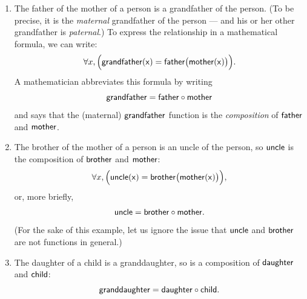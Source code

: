 \begin{example}{} 
\begin{enumerate}
\item The father of the mother of a person is a grandfather of the person.
 (To be precise, it is the \emph{maternal} grandfather of the person --- and his or her other grandfather is \emph{paternal}.) To express the relationship in a mathematical formula, we can write:
 $$ \forall x,  \Bigl( \sf{grandfather}(x) = \sf{father} \bigl( \sf{mother}(x) \bigr) \Bigr) .$$
 A mathematician abbreviates this formula by writing
 $$ \sf{grandfather} = \sf{father} \circ \sf{mother} $$
 and says that the (maternal) $\sf{grandfather}$ function is the \emph{composition} of $\sf{father}$ and $\sf{mother}$.
 \item The brother of the mother of a person is an uncle of the person, so $\sf{uncle}$ is the composition of $\sf{brother}$ and $\sf{mother}$:
  $$ \forall x, \Bigl( \sf{uncle}(x) = \sf{brother} \bigl( \sf{mother}(x) \bigr) \Bigr) ,$$ 
  or, more briefly,
  $$ \sf{uncle} = \sf{brother} \circ \sf{mother} .$$
 (For the sake of this example, let us ignore the issue that $\sf{uncle}$ and $\sf{brother}$ are not functions in general.)
\item The daughter of a child is a granddaughter, so  is a composition of $\sf{daughter}$ and $\sf{child}$:
$$ \sf{granddaughter} = \sf{daughter} \circ \sf{child} .$$
\end{enumerate}
\end{example}


